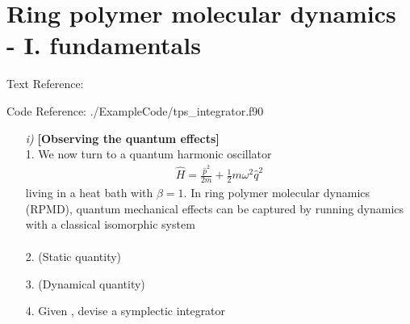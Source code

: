 \documentclass[aip,graphicx,sd, amsmath,amssymb]{revtex4-1}
\begin{document}
\section{Ring polymer molecular dynamics - I. fundamentals}
Text Reference: 

Code Reference: ./ExampleCode/tps\_integrator.f90

\begin{enumerate}
\item[\it{i})] \textbf{[Observing the quantum effects]} \\
1. We now turn to a quantum harmonic oscillator
\begin{align}
\hat{H} = \frac{\hat{p}^2}{2m} + \frac12 m \omega^2 \hat{q}^2
\end{align}
 living in a heat bath with $\beta=1$. In ring polymer molecular dynamics (RPMD), quantum mechanical effects can be captured by running dynamics with a classical isomorphic system
\begin{align} 
\end{align}

2. (Static quantity)

3. (Dynamical quantity)

4. Given , devise a symplectic integrator  

\end{enumerate}
\end{document}
